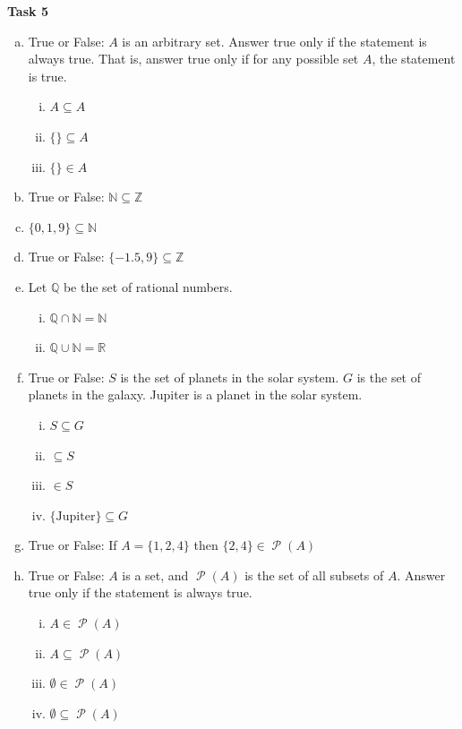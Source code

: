 \documentclass[12pt,letterpaper]{article}
\newcommand\N{\mathbb N}
\newcommand\Z{\mathbb Z}
\newcommand\R{\mathbb R}
\newcommand\Pow{\ensuremath{\operatorname{\mathcal{P}}}}
\newif\ifsol
\begin{document}
    \textbf{Task 5}
      \begin{enumerate}[a.]
        \item True or False: $A$ is an arbitrary set. Answer true only if the statement is always true. That is, answer true only if for any possible set $A$, the statement is true. 
          \begin{enumerate}[i.]
            \item $A \subseteq A$ \ifsol  (T)  \fi
            \item $\{\} \subseteq A$\ifsol  (T)  \fi
            \item $\{\} \in A$ \ifsol  (F)  \fi
		 \end{enumerate}
        \item True or False:  $\N \subseteq \Z$  \ifsol  (T)  \fi
        \item $\{0, 1, 9\} \subseteq \N$  \ifsol  (T)  \fi
        \item True or False: $\{-1.5, 9\} \subseteq \Z$  \ifsol  (F)  \fi
        
        \item Let $\mathbb{Q}$ be the set of rational numbers. 
        \begin{enumerate}[i.]
          \item $\mathbb{Q} \cap \N = \N$  \ifsol  (T)  \fi
          \item $\mathbb{Q} \cup \N = \R$  \ifsol  (F)  \fi
        \end{enumerate}
        
        \item True or False: $S$ is the set of planets in the solar system. $G$ is the set of planets in the galaxy. Jupiter is a planet in the solar system.
        \begin{enumerate}[i.]
          \item $S \subseteq G$  \ifsol  (T)  \fi
          \item {} $\subseteq S$  \ifsol  (F)  \fi
          \item {} $\in S$  \ifsol  (T)  \fi
          \item $\{\text{Jupiter}\} \subseteq G$  \ifsol  (T)  \fi
        \end{enumerate}
        
	    \item True or False: If $A = \{1,2,4\}$ then $\{2,4\} \in \Pow{(A)}$  \ifsol  (T)  \fi
	    
        \item True or False: $A$ is a set, and $\Pow{(A)}$ is the set of all subsets of $A$. Answer true only if the statement is always true.
		\begin{enumerate}[i.]
		   \item $A \in \Pow{(A)}$  \ifsol  (T)  \fi
		   \item $A \subseteq \Pow{(A)}$  \ifsol  (F)  \fi
		   \item $\emptyset \in \Pow{(A)}$  \ifsol  (T)  \fi
		   \item $\emptyset \subseteq \Pow{(A)}$  \ifsol  (T)  \fi
          \end{enumerate}
          

\end{enumerate}
\end{document}
